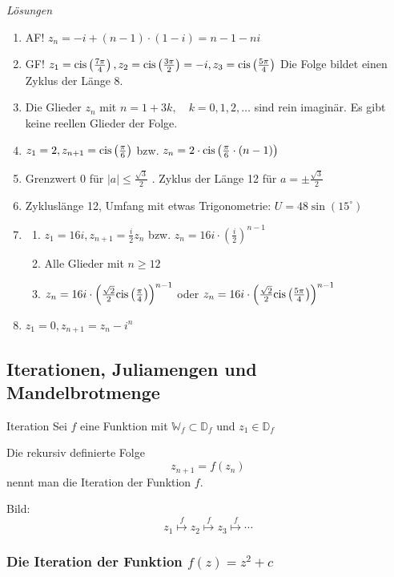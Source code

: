 \clearpage
\emph{Lösungen}
\begin{enumerate}
    \item AF! $z_n = -i +(n-1)\cdot (1-i) = n-1 - ni$
    \item GF! $z_1 = \mathrm{cis}\left(\frac{7\pi}{4}\right), z_2 = \mathrm{cis}\left(\frac{3\pi}{2} \right) = -i , z_3 = \mathrm{cis}\left(\frac{5\pi}{4}\right)$ Die Folge bildet einen Zyklus der Länge 8.
    \item Die Glieder $z_n$ mit $n= 1 + 3k, \quad k= 0,1,2,\ldots$ sind rein imaginär. Es gibt keine reellen Glieder der Folge.
    \item $z_1 = 2, z_{n+1} = \mathrm{cis}\left(\frac{\pi}{6}\right)$  bzw. $z_n = 2\cdot \mathrm{cis}\left(\frac{\pi}{6} \cdot (n-1)\right)$
    \item Grenzwert $0$ für $|a|\le \frac{\sqrt{3}}{2}$ . Zyklus der Länge 12 für $a = \pm \frac{\sqrt{3}}{2}$
    \item Zykluslänge 12, Umfang mit etwas Trigonometrie: $U = 48\sin(15^\circ)$
    \item \begin{enumerate}
        \item $z_1 = 16i, z_{n+1} = \frac{i}{2} z_n$ bzw. $z_n = 16i \cdot \left( \frac{i}{2} \right)^{n-1}$
        \item  Alle Glieder mit $n\ge 12$
        \item $z_n = 16 i  \cdot \left(\frac{\sqrt{2}}{2}\mathrm{cis}\left(\frac{\pi}{4}\right)\right)^{n-1}$ oder $z_n = 16 i  \cdot \left(\frac{\sqrt{2}}{2}\mathrm{cis}\left(\frac{5\pi}{4}\right)\right)^{n-1}$ 
    \end{enumerate}
    \item  $z_1 = 0, z_{n+1} = z_n - i^n$ 
\end{enumerate}
\clearpage
\subsection{Iterationen, Juliamengen und Mandelbrotmenge}
\begin{definition}
    {Iteration}{}
    Sei $f$ eine Funktion mit $\mathbb{W}_f \subset \mathbb{D}_f$ und $z_1 \in \mathbb{D}_f$

    Die rekursiv definierte Folge
    $$ z_{n+1} = f(z_n) $$
    nennt man die Iteration der Funktion $f$.

    Bild:
    $$ z_1 \stackrel{f}{\mapsto} z_2 \stackrel{f}{\mapsto} z_3 \stackrel{f}{\mapsto} \cdots $$
\end{definition}

\subsubsection*{Die Iteration der Funktion \( f(z) = z^2 + c \)}

